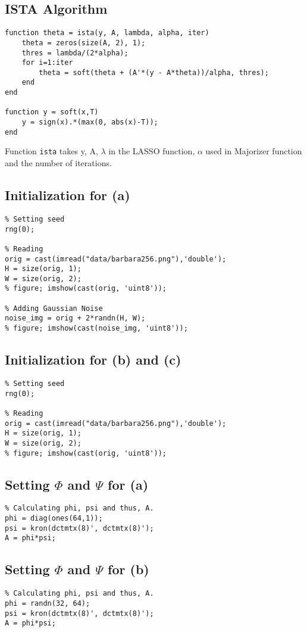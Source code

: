 \documentclass[fleqn, 11pt]{article}
\begin{document}
\subsection*{ISTA Algorithm}
\begin{verbatim}
function theta = ista(y, A, lambda, alpha, iter)
    theta = zeros(size(A, 2), 1);
    thres = lambda/(2*alpha);
    for i=1:iter
        theta = soft(theta + (A'*(y - A*theta))/alpha, thres);
    end
end

function y = soft(x,T)
    y = sign(x).*(max(0, abs(x)-T));
end
\end{verbatim}
Function \texttt{ista} takes y, A, $\lambda$ in the LASSO function, $\alpha$ used in Majorizer function and the number of iterations. \\

\subsection*{Initialization for (a)}
\begin{verbatim}
% Setting seed
rng(0);

% Reading
orig = cast(imread("data/barbara256.png"),'double');
H = size(orig, 1);
W = size(orig, 2);
% figure; imshow(cast(orig, 'uint8'));

% Adding Gaussian Noise
noise_img = orig + 2*randn(H, W);
% figure; imshow(cast(noise_img, 'uint8'));
\end{verbatim}

\subsection*{Initialization for (b) and (c)}
\begin{verbatim}
% Setting seed
rng(0);

% Reading
orig = cast(imread("data/barbara256.png"),'double');
H = size(orig, 1);
W = size(orig, 2);
% figure; imshow(cast(orig, 'uint8'));
\end{verbatim}

\subsection*{Setting $\Phi$ and $\Psi$ for (a)}
\begin{verbatim}
% Calculating phi, psi and thus, A.
phi = diag(ones(64,1));
psi = kron(dctmtx(8)', dctmtx(8)');
A = phi*psi;
\end{verbatim}

\subsection*{Setting $\Phi$ and $\Psi$ for (b)}
\begin{verbatim}
% Calculating phi, psi and thus, A.
phi = randn(32, 64);
psi = kron(dctmtx(8)', dctmtx(8)');
A = phi*psi;
\end{verbatim}
\end{document}
